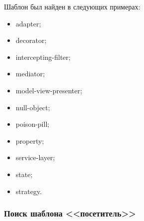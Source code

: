 Шаблон был найден в следующих примерах:
\begin{itemize}
\item adapter;
\item decorator;
\item intercepting-filter;
\item mediator;
\item model-view-presenter;
\item null-object;
\item poison-pill;
\item property;
\item service-layer;
\item state;
\item strategy.
\end{itemize}

\subsubsection{Поиск шаблона <<посетитель>>}
